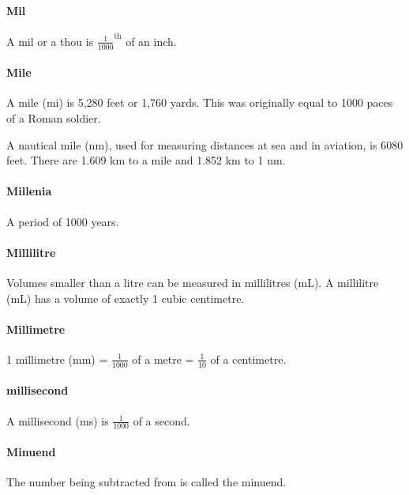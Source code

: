 \documentclass[12pt]{article}
\begin{document}
\paragraph{Mil}
A mil or a thou is $\frac{1}{1000}^{\textrm{th}}$ of an inch.

\paragraph{Mile}
A mile (mi) is 5,280 feet or 1,760 yards. This was originally equal to 1000 paces of a Roman soldier.

A nautical mile (nm), used for measuring distances at sea and in aviation, is 6080 feet. There are 1.609 km to a mile and 1.852 km to 1 nm.

\paragraph{Millenia}
A period of 1000 years.

\paragraph{Millilitre} Volumes smaller than a litre can be measured in millilitres (mL). A millilitre (mL) has a volume of exactly 1 cubic centimetre.

\begin{center}
\end{center}

\paragraph{Millimetre} 1 millimetre (mm) = $\frac{1}{1000}$ of a metre = $\frac{1}{10}$ of a centimetre.

\paragraph{millisecond}
A millisecond (ms) is $\frac{1}{1000}$ of a second.

\paragraph{Minuend}
The number being subtracted from is called the minuend.
\end{document}
